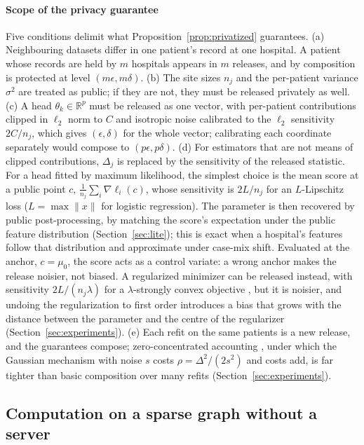 \documentclass[acmsmall,screen,review]{acmart}
\theoremstyle{acmdefinition}
\begin{document}
\paragraph{Scope of the privacy guarantee} Five conditions delimit what Proposition~\ref{prop:privatized} guarantees. (a) Neighbouring datasets differ in one patient's record at one hospital. A patient whose records are held by $m$ hospitals appears in $m$ releases, and by composition is protected at level $(m\epsilon,m\delta)$. (b) The site sizes $n_j$ and the per-patient variance $\sigma^2$ are treated as public; if they are not, they must be released privately as well. (c) A head $\theta_k\in\mathbb{R}^p$ must be released as one vector, with per-patient contributions clipped in $\ell_2$ norm to $C$ and isotropic noise calibrated to the $\ell_2$ sensitivity $2C/n_j$, which gives $(\epsilon,\delta)$ for the whole vector; calibrating each coordinate separately would compose to $(p\epsilon,p\delta)$. (d) For estimators that are not means of clipped contributions, $\Delta_j$ is replaced by the sensitivity of the released statistic. For a head fitted by maximum likelihood, the simplest choice is the mean score at a public point $c$, $\frac{1}{n_j}\sum_i \nabla\ell_i(c)$, whose sensitivity is $2L/n_j$ for an $L$-Lipschitz loss ($L=\max\|x\|$ for logistic regression). The parameter is then recovered by public post-processing, by matching the score's expectation under the public feature distribution (Section~\ref{sec:lite}); this is exact when a hospital's features follow that distribution and approximate under case-mix shift. Evaluated at the anchor, $c=\mu_0$, the score acts as a control variate: a wrong anchor makes the release noisier, not biased. A regularized minimizer can be released instead, with sensitivity $2L/(n_j\lambda)$ for a $\lambda$-strongly convex objective \cite{chaudhuri2011differentially}, but it is noisier, and undoing the regularization to first order introduces a bias that grows with the distance between the parameter and the centre of the regularizer (Section~\ref{sec:experiments}). (e) Each refit on the same patients is a new release, and the guarantees compose; zero-concentrated accounting \cite{bun2016concentrated}, under which the Gaussian mechanism with noise $s$ costs $\rho=\Delta^2/(2s^2)$ and costs add, is far tighter than basic composition over many refits (Section~\ref{sec:experiments}).

\subsection{Computation on a sparse graph without a server}\label{sec:gossip}
\end{document}
